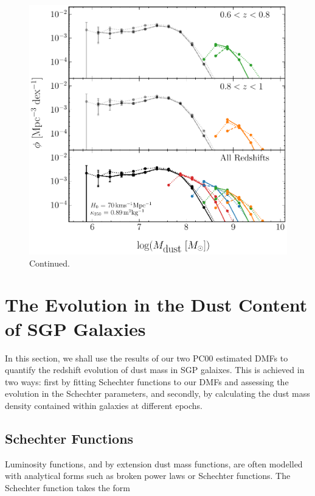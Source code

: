 \begin{figure}
    \ContinuedFloat
    \centering
    \includegraphics[width=\columnwidth]{Figures/dmf_methods_part2.pdf}
    \caption{Continued.}
\end{figure}

\section{The Evolution in the Dust Content of SGP Galaxies}

In this section, we shall use the results of our two PC00 estimated DMFs to quantify the redshift evolution of dust mass in SGP galaixes. This is achieved in two ways: first by fitting Schechter functions to our DMFs and assessing the evolution in the Schechter parameters, and secondly, by calculating the dust mass density contained within galaxies at different epochs.

\subsection{Schechter Functions}
\label{sec:schechter_functions}

Luminosity functions, and by extension dust mass functions, are often modelled with analytical forms such as broken power laws or Schechter functions. The Schechter function takes the form

